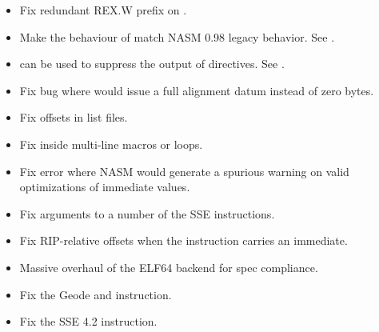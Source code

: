 
\begin{itemize}
    \item{Fix redundant REX.W prefix on .}
    \item{Make the behaviour of  match NASM 0.98 legacy behavior.
        See .}
    \item{ can be used to suppress the output of  directives.
        See .}
    \item{Fix bug where  would issue a full alignment datum instead of
        zero bytes.}
    \item{Fix offsets in list files.}
    \item{Fix  inside multi-line macros or loops.}
    \item{Fix error where NASM would generate a spurious warning on valid
        optimizations of immediate values.}
    \item{Fix arguments to a number of the  SSE instructions.}
    \item{Fix RIP-relative offsets when the instruction carries an immediate.}
    \item{Massive overhaul of the ELF64 backend for spec compliance.}
    \item{Fix the Geode  and  instruction.}
    \item{Fix the SSE 4.2  instruction.}
\end{itemize}



